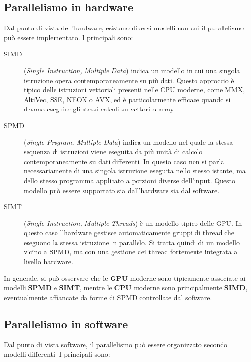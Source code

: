\subsection{Parallelismo in hardware}

Dal punto di vista dell'hardware, esistono diversi modelli con cui il parallelismo può essere implementato. I principali sono:

\begin{description}
    \item[SIMD] (\emph{Single Instruction, Multiple Data}) indica un modello in cui una singola istruzione opera contemporaneamente su più dati. Questo approccio è tipico delle istruzioni vettoriali presenti nelle CPU moderne, come MMX, AltiVec, SSE, NEON o AVX, ed è particolarmente efficace quando si devono eseguire gli stessi calcoli su vettori o array.
    
    \item[SPMD] (\emph{Single Program, Multiple Data}) indica un modello nel quale la stessa sequenza di istruzioni viene eseguita da più unità di calcolo contemporaneamente su dati differenti. In questo caso non si parla necessariamente di una singola istruzione eseguita nello stesso istante, ma dello stesso programma applicato a porzioni diverse dell'input. Questo modello può essere supportato sia dall'hardware sia dal software.
    
    \item[SIMT] (\emph{Single Instruction, Multiple Threads}) è un modello tipico delle GPU. In questo caso l'hardware gestisce automaticamente gruppi di thread che eseguono la stessa istruzione in parallelo. Si tratta quindi di un modello vicino a SPMD, ma con una gestione dei thread fortemente integrata a livello hardware.
\end{description}

In generale, si può osservare che le \textbf{GPU} moderne sono tipicamente associate ai modelli \textbf{SPMD} e \textbf{SIMT}, mentre le \textbf{CPU} moderne sono principalmente \textbf{SIMD}, eventualmente affiancate da forme di SPMD controllate dal software.

\subsection{Parallelismo in software}

Dal punto di vista software, il parallelismo può essere organizzato secondo modelli differenti. I principali sono:

